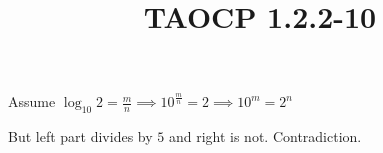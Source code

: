 \documentclass{article}
\title{TAOCP 1.2.2\mbox{-}10}
\begin{document}
\maketitle

Assume \( \log_{10} 2 = \frac{m}{n} \implies 10^{\frac{m}{n}} = 2 \implies 10^{m} = 2^{n} \)

But left part divides by \( 5 \) and right is not. Contradiction.
\end{document}
